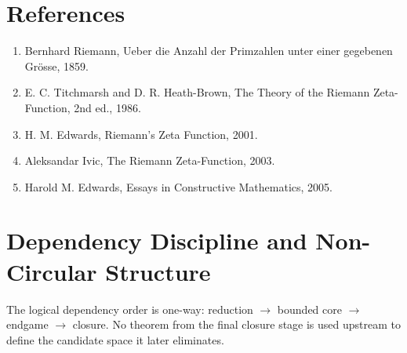 \documentclass[11pt,a4paper]{article}
\begin{document}
\section{References}
\begin{enumerate}
    \item Bernhard Riemann, Ueber die Anzahl der Primzahlen unter einer gegebenen Grösse, 1859.
    \item E. C. Titchmarsh and D. R. Heath-Brown, The Theory of the Riemann Zeta-Function, 2nd ed., 1986.
    \item H. M. Edwards, Riemann's Zeta Function, 2001.
    \item Aleksandar Ivic, The Riemann Zeta-Function, 2003.
    \item Harold M. Edwards, Essays in Constructive Mathematics, 2005.
\end{enumerate}

\section{Dependency Discipline and Non-Circular Structure}
The logical dependency order is one-way: reduction \(\to\) bounded core \(\to\) endgame \(\to\) closure. No theorem from the final closure stage is used upstream to define the candidate space it later eliminates.

\end{document}
